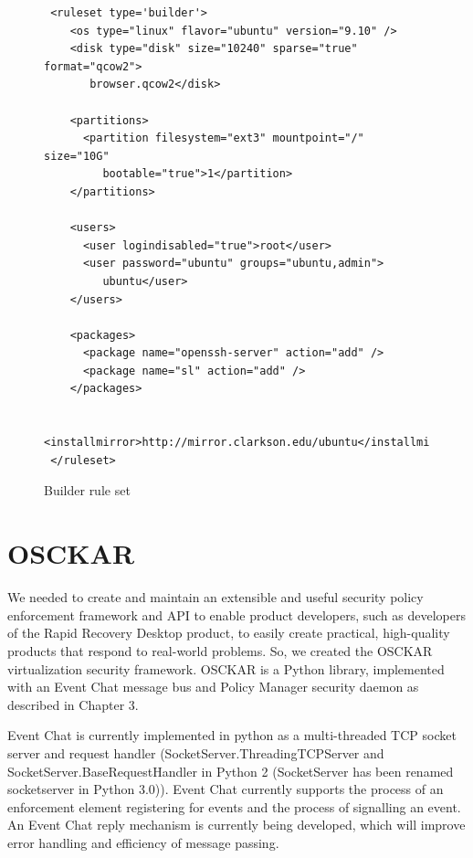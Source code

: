 \begin{figure}[tbp]
\caption{Builder rule set}
\label{lst:builder-ruleset}

\begin{lstlisting}
 <ruleset type='builder'>
    <os type="linux" flavor="ubuntu" version="9.10" />
    <disk type="disk" size="10240" sparse="true" format="qcow2">
       browser.qcow2</disk>

    <partitions>
      <partition filesystem="ext3" mountpoint="/" size="10G" 
         bootable="true">1</partition>
    </partitions>

    <users>
      <user logindisabled="true">root</user>
      <user password="ubuntu" groups="ubuntu,admin">
         ubuntu</user>
    </users>
    
    <packages>
      <package name="openssh-server" action="add" />
      <package name="sl" action="add" />    
    </packages>

    <installmirror>http://mirror.clarkson.edu/ubuntu</installmirror>
 </ruleset>
\end{lstlisting}
\end{figure}

\section{OSCKAR}
\label{sec:implementation:OSCKAR}

We needed to create and maintain an extensible and useful security policy
enforcement framework and API to enable product developers, such as developers of the Rapid Recovery Desktop product, to easily create practical, high-quality products that respond to real-world problems. So, we created the OSCKAR virtualization security framework. OSCKAR is a Python library, implemented with an Event Chat message bus and Policy Manager security daemon as described in Chapter 3. 

Event Chat is currently implemented in python as a multi-threaded TCP socket server and request handler (SocketServer.ThreadingTCPServer and SocketServer.BaseRequestHandler in Python 2 (SocketServer has been renamed socketserver in Python 3.0)). Event Chat currently supports the process of an enforcement element registering for events and the process of signalling an event. An Event Chat reply mechanism is currently being developed, which will improve error handling and efficiency of message passing.

